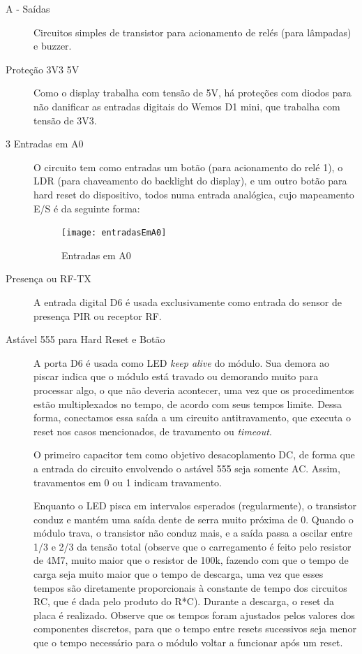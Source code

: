 \begin{description}
\item [A - Saídas] Circuitos simples de transistor para acionamento de relés (para lâmpadas) e buzzer.
\item [Proteção 3V3 5V] Como o display trabalha com tensão de 5V, há proteções com diodos para não danificar as entradas digitais do Wemos D1 mini, que trabalha com tensão de 3V3.
\item [3 Entradas em A0] O circuito tem como entradas um botão (para acionamento do relé 1), o LDR (para chaveamento do backlight do display), e um outro botão para hard reset do dispositivo, todos numa entrada analógica, cujo mapeamento E/S é da seguinte forma:

\begin{figure}[H]
	\centering
	\caption{Entradas em A0}
  \texttt{[image: entradasEmA0]}
\label{fig:entradasEmA0}
\end{figure}

\item [Presença ou RF-TX] A entrada digital D6 é usada exclusivamente como entrada do sensor de presença PIR ou receptor RF.
\item [Astável 555 para Hard Reset e Botão] A porta D6 é usada como LED \textit{keep alive} do módulo. Sua demora ao piscar indica que o módulo está travado ou demorando muito para processar algo, o que não deveria acontecer, uma vez que os procedimentos estão multiplexados no tempo, de acordo com seus tempos limite. Dessa forma, conectamos essa saída a um circuito antitravamento, que executa o reset nos casos mencionados, de travamento ou \textit{timeout}.

O primeiro capacitor tem como objetivo desacoplamento DC, de forma que a entrada do circuito envolvendo o astável 555 seja somente AC. Assim, travamentos em 0 ou 1 indicam travamento.

Enquanto o LED pisca em intervalos esperados (regularmente), o transistor conduz e mantém uma saída dente de serra muito próxima de 0. Quando o módulo trava, o transistor não conduz mais, e a saída passa a oscilar entre 1/3 e 2/3 da tensão total (observe que o carregamento é feito pelo resistor de 4M7, muito maior que o resistor de 100k, fazendo com que o tempo de carga seja muito maior que o tempo de descarga, uma vez que esses tempos são diretamente proporcionais à constante de tempo dos circuitos RC, que é dada pelo produto do R*C). Durante a descarga, o reset da placa é realizado. Observe que os tempos foram ajustados pelos valores dos componentes discretos, para que o tempo entre resets sucessivos seja menor que o tempo necessário para o módulo voltar a funcionar após um reset.


\end{description}

